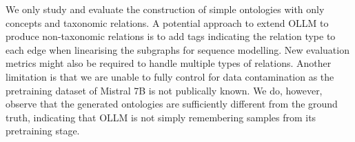 \documentclass{article}
\newcommand{\name}{{OLLM}\xspace}
\begin{document}
We only study and evaluate the construction of simple ontologies with only concepts and taxonomic relations. A potential approach to extend \name to produce non-taxonomic relations is to add tags indicating the relation type to each edge when linearising the subgraphs for sequence modelling. New evaluation metrics might also be required to handle multiple types of relations. Another limitation is that we are unable to fully control for data contamination as the pretraining dataset of Mistral 7B is not publically known. We do, however, observe that the generated ontologies are sufficiently different from the ground truth, indicating that \name is not simply remembering samples from its pretraining stage.





\appendix



\newpage

\end{document}
